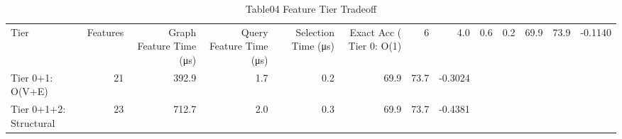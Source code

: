 \begin{table}[htbp]
\centering
\caption{Table04 Feature Tier Tradeoff}
\begin{tabular}{lrrrrrrr}
\hline
Tier & Features & Graph Feature Time (μs) & Query Feature Time (μs) & Selection Time (μs) & Exact Acc (%
\hline
Tier 0: O(1) & 6 & 4.0 & 0.6 & 0.2 & 69.9 & 73.9 & -0.1140 \\
Tier 0+1: O(V+E) & 21 & 392.9 & 1.7 & 0.2 & 69.9 & 73.7 & -0.3024 \\
Tier 0+1+2: Structural & 23 & 712.7 & 2.0 & 0.3 & 69.9 & 73.7 & -0.4381 \\
\hline
\end{tabular}
\end{table}
